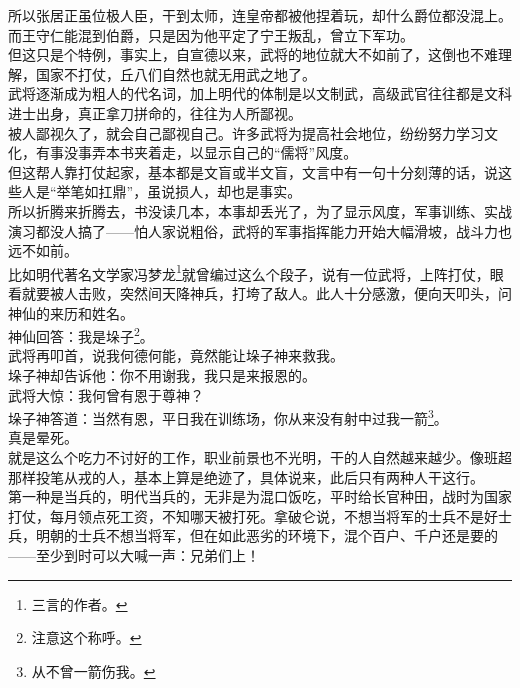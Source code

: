 \begin{multicols}{\theparacolNo}
所以张居正虽位极人臣，干到太师，连皇帝都被他捏着玩，却什么爵位都没混上。而王守仁能混到伯爵，只是因为他平定了宁王叛乱，曾立下军功。\\

但这只是个特例，事实上，自宣德以来，武将的地位就大不如前了，这倒也不难理解，国家不打仗，丘八们自然也就无用武之地了。\\

武将逐渐成为粗人的代名词，加上明代的体制是以文制武，高级武官往往都是文科进士出身，真正拿刀拼命的，往往为人所鄙视。\\

被人鄙视久了，就会自己鄙视自己。许多武将为提高社会地位，纷纷努力学习文化，有事没事弄本书夹着走，以显示自己的“儒将”风度。\\

但这帮人靠打仗起家，基本都是文盲或半文盲，文言中有一句十分刻薄的话，说这些人是“举笔如扛鼎”，虽说损人，却也是事实。\\

所以折腾来折腾去，书没读几本，本事却丢光了，为了显示风度，军事训练、实战演习都没人搞了——怕人家说粗俗，武将的军事指挥能力开始大幅滑坡，战斗力也远不如前。\\

比如明代著名文学家冯梦龙\footnote{三言的作者。}就曾编过这么个段子，说有一位武将，上阵打仗，眼看就要被人击败，突然间天降神兵，打垮了敌人。此人十分感激，便向天叩头，问神仙的来历和姓名。\\

神仙回答：我是垛子\footnote{注意这个称呼。}。\\

武将再叩首，说我何德何能，竟然能让垛子神来救我。\\

垛子神却告诉他：你不用谢我，我只是来报恩的。\\

武将大惊：我何曾有恩于尊神？\\

垛子神答道：当然有恩，平日我在训练场，你从来没有射中过我一箭\footnote{从不曾一箭伤我。}。\\

真是晕死。\\

就是这么个吃力不讨好的工作，职业前景也不光明，干的人自然越来越少。像班超那样投笔从戎的人，基本上算是绝迹了，具体说来，此后只有两种人干这行。\\

第一种是当兵的，明代当兵的，无非是为混口饭吃，平时给长官种田，战时为国家打仗，每月领点死工资，不知哪天被打死。拿破仑说，不想当将军的士兵不是好士兵，明朝的士兵不想当将军，但在如此恶劣的环境下，混个百户、千户还是要的——至少到时可以大喊一声：兄弟们上！\\


\end{multicols}
